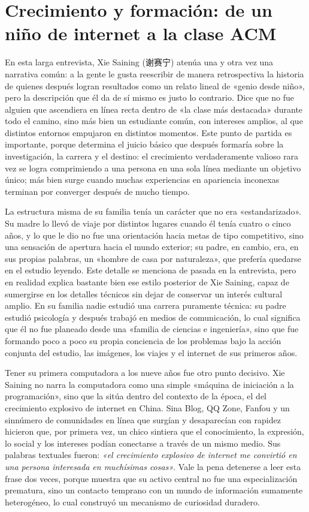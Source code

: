\documentclass[a4paper,12pt]{article}
\begin{document}
\section{Crecimiento y formación: de un niño de internet a la clase ACM}

En esta larga entrevista, Xie Saining (谢赛宁) atenúa una y otra vez una narrativa común: a la gente le gusta reescribir de manera retrospectiva la historia de quienes después logran resultados como un relato lineal de «genio desde niño», pero la descripción que él da de sí mismo es justo lo contrario. Dice que no fue alguien que ascendiera en línea recta dentro de «la clase más destacada» durante todo el camino, sino más bien un estudiante común, con intereses amplios, al que distintos entornos empujaron en distintos momentos. Este punto de partida es importante, porque determina el juicio básico que después formaría sobre la investigación, la carrera y el destino: el crecimiento verdaderamente valioso rara vez se logra comprimiendo a una persona en una sola línea mediante un objetivo único; más bien surge cuando muchas experiencias en apariencia inconexas terminan por converger después de mucho tiempo.

La estructura misma de su familia tenía un carácter que no era «estandarizado». Su madre lo llevó de viaje por distintos lugares cuando él tenía cuatro o cinco años, y lo que le dio no fue una orientación hacia metas de tipo competitivo, sino una sensación de apertura hacia el mundo exterior; su padre, en cambio, era, en sus propias palabras, un «hombre de casa por naturaleza», que prefería quedarse en el estudio leyendo. Este detalle se menciona de pasada en la entrevista, pero en realidad explica bastante bien ese estilo posterior de Xie Saining, capaz de sumergirse en los detalles técnicos sin dejar de conservar un interés cultural amplio. En su familia nadie estudió una carrera puramente técnica: su padre estudió psicología y después trabajó en medios de comunicación, lo cual significa que él no fue planeado desde una «familia de ciencias e ingeniería», sino que fue formando poco a poco su propia conciencia de los problemas bajo la acción conjunta del estudio, las imágenes, los viajes y el internet de sus primeros años.

Tener su primera computadora a los nueve años fue otro punto decisivo. Xie Saining no narra la computadora como una simple «máquina de iniciación a la programación», sino que la sitúa dentro del contexto de la época, el del crecimiento explosivo de internet en China. Sina Blog, QQ Zone, Fanfou y un sinnúmero de comunidades en línea que surgían y desaparecían con rapidez hicieron que, por primera vez, un chico sintiera que el conocimiento, la expresión, lo social y los intereses podían conectarse a través de un mismo medio. Sus palabras textuales fueron: \textit{«el crecimiento explosivo de internet me convirtió en una persona interesada en muchísimas cosas»}. Vale la pena detenerse a leer esta frase dos veces, porque muestra que su activo central no fue una especialización prematura, sino un contacto temprano con un mundo de información sumamente heterogéneo, lo cual construyó un mecanismo de curiosidad duradero.
\end{document}
